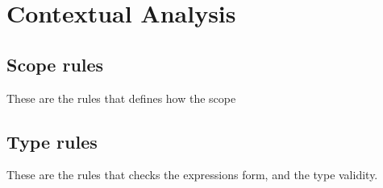 \section{Contextual Analysis}

	\subsection{Scope rules}
	These are the rules that defines how the scope 	
	
	
	
	
	\subsection{Type rules}
	These are the rules that checks the expressions form, and the type validity.
	
	